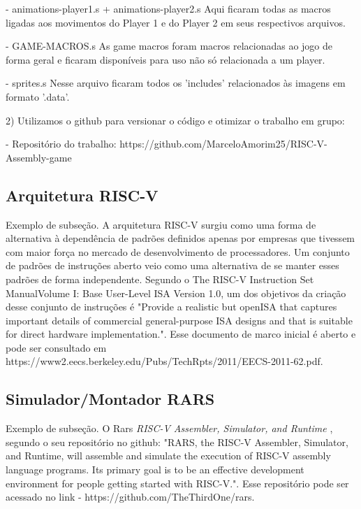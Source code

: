 \documentclass[a4paper]{sbgames}
\begin{document}
- animations-player1.s + animations-player2.s
	Aqui ficaram todas as macros ligadas aos movimentos do Player 1 e do Player 2 em seus respectivos arquivos.
	
- GAME-MACROS.s
	As game macros foram macros relacionadas ao jogo de forma geral e ficaram disponíveis para uso não só relacionada a um player.

- sprites.s
	Nesse arquivo ficaram todos os 'includes' relacionados às imagens em formato '.data'.

2) Utilizamos o github para versionar o código e otimizar o trabalho em grupo:

- Repositório do trabalho:
 	 https://github.com/MarceloAmorim25/RISC-V-Assembly-game

\subsection{Arquitetura RISC-V}{
\label{sec:MIPS}
Exemplo de subseção. A arquitetura RISC-V \cite{patterson2005organizaccao} surgiu como uma forma de alternativa à dependência de padrões definidos apenas por empresas que tivessem com maior força no mercado de desenvolvimento de processadores. Um conjunto de padrões de instruções aberto veio como uma alternativa de se manter esses padrões de forma independente. Segundo o The RISC-V Instruction Set ManualVolume I: Base User-Level ISA Version 1.0, um dos objetivos da criação desse conjunto de instruções é "Provide  a realistic but openISA  that  captures  important  details  of  commercial  general-purpose ISA designs and that is suitable for direct hardware implementation.". Esse documento de marco inicial é aberto e pode ser consultado em https://www2.eecs.berkeley.edu/Pubs/TechRpts/2011/EECS-2011-62.pdf.
 
}


\subsection{Simulador/Montador RARS}{
\label{sec:Rars}
Exemplo de subseção. O Rars \textit{RISC-V Assembler, Simulator, and Runtime} \cite{Mars1}, segundo o seu repositório no github: "RARS, the RISC-V Assembler, Simulator, and Runtime, will assemble and simulate the execution of RISC-V assembly language programs. Its primary goal is to be an effective development environment for people getting started with RISC-V.". Esse repositório pode ser acessado no link - https://github.com/TheThirdOne/rars.

}
\end{document}
